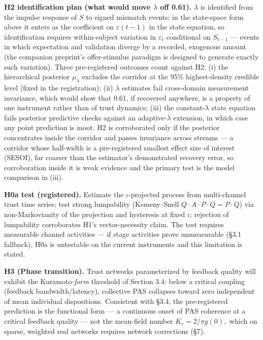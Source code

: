 \documentclass[11pt,twocolumn]{article}
\theoremstyle{gttdef}
\theoremstyle{gttplain}
\begin{document}
\textbf{H2 identification plan (what would move $\lambda$ off 0.61).} $\lambda$ is identified from the impulse response of $S$ to signed mismatch events: in the state-space form above it enters as the coefficient on $\varepsilon(t-1)$ in the state equation, so identification requires within-subject variation in $\varepsilon_t$ conditional on $S_{t-1}$ --- events in which expectation and validation diverge by a recorded, exogenous amount (the companion preprint's offer-stimulus paradigm is designed to generate exactly such variation). Three pre-registered outcomes count against H2: (i) the hierarchical posterior $\mu_\lambda$ excludes the corridor at the 95\% highest-density credible level (fixed in the registration); (ii) $\lambda$ estimates fail cross-domain measurement invariance, which would show that 0.61, if recovered anywhere, is a property of one instrument rather than of trust dynamics; (iii) the constant-$\lambda$ state equation fails posterior predictive checks against an adaptive-$\lambda$ extension, in which case any point prediction is moot. H2 is corroborated only if the posterior concentrates inside the corridor and passes invariance across streams --- a corridor whose half-width is a pre-registered smallest effect size of interest (SESOI), far coarser than the estimator's demonstrated recovery error, so corroboration inside it is weak evidence and the primary test is the model comparison in (iii).

\textbf{H0a test (registered).} Estimate the $\iota$-projected process from multi-channel trust time series; test strong lumpability (Kemeny--Snell $Q \cdot A \cdot P \cdot Q = P \cdot Q$) via non-Markovianity of the projection and hysteresis at fixed $\iota$; rejection of lumpability corroborates H1's vector-necessity claim. The test requires measurable channel activities --- if stage activities prove unmeasurable (\S{}3.1 fallback), H0a is untestable on the current instruments and this limitation is stated.

\textbf{H3 (Phase transition).} Trust networks parameterized by feedback quality will exhibit the Kuramoto-\emph{form} threshold of Section 3.4: below a critical coupling (feedback bandwidth/latency), collective PAS collapses toward zero independent of mean individual dispositions. Consistent with \S{}3.4, the pre-registered prediction is the functional form --- a continuous onset of PAS coherence at a critical feedback quality --- not the mean-field number $K_c = 2/\pi g(0),$ which on sparse, weighted real networks requires network corrections (\S{}7).
\end{document}
